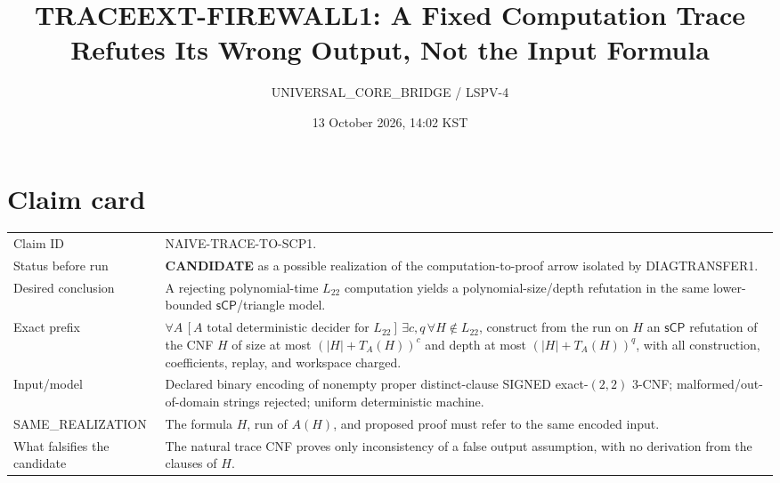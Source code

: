 \documentclass[11pt]{article}
\title{TRACEEXT-FIREWALL1: A Fixed Computation Trace\\Refutes Its Wrong Output, Not the Input Formula}
\author{UNIVERSAL\_CORE\_BRIDGE / LSPV-4}
\date{13 October 2026, 14:02 KST}
\newcommand{\Ltwo}{L_{22}}
\newcommand{\sCP}{\mathsf{sCP}}
\newcommand{\CAND}{\textbf{CANDIDATE}}
\begin{document}
\maketitle

\begin{center}
\end{center}

\section{Claim card}
\begin{tabularx}{\textwidth}{@{}lX@{}}
\toprule
Claim ID & \textsf{NAIVE-TRACE-TO-SCP1}.\\
Status before run & \CAND{} as a possible realization of the computation-to-proof arrow isolated by DIAGTRANSFER1.\\
Desired conclusion & A rejecting polynomial-time \(\Ltwo\) computation yields a polynomial-size/depth refutation in the same lower-bounded \(\sCP\)/triangle model.\\
Exact prefix & \(\forall A\,[A\text{ total deterministic decider for }\Ltwo]\,\exists c,q\,\forall H\notin\Ltwo\), construct from the run on \(H\) an \(\sCP\) refutation of the CNF \(H\) of size at most \((|H|+T_A(H))^c\) and depth at most \((|H|+T_A(H))^q\), with all construction, coefficients, replay, and workspace charged.\\
Input/model & Declared binary encoding of nonempty proper distinct-clause SIGNED exact-\((2,2)\) 3-CNF; malformed/out-of-domain strings rejected; uniform deterministic machine.\\
SAME\_REALIZATION & The formula \(H\), run of \(A(H)\), and proposed proof must refer to the same encoded input.\\
What falsifies the candidate & The natural trace CNF proves only inconsistency of a false output assumption, with no derivation from the clauses of \(H\).\\
\bottomrule
\end{tabularx}
\end{document}

